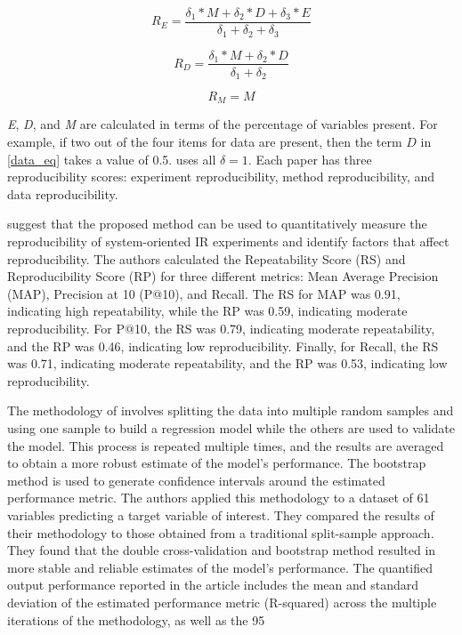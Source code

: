 \documentclass[12pt, a4paper, twocolumn]{article}
\begin{document}
			\begin{equation}
				R_{E} = \frac{\delta_1*M + \delta_2*D + \delta_3*E}{\delta_1 + \delta_2 + \delta_3}
			\end{equation}

			\begin{equation}\label{data_eq}
				R_{D} = \frac{\delta_1*M + \delta_2*D }{\delta_1 + \delta_2}
			\end{equation}

			\begin{equation}
				R_{M} = M 
			\end{equation}

			\textit{E}, \textit{D}, and \textit{M} are calculated in terms of the percentage of variables present. For example, if two out of the four items for data are present, then the term $D$ in \eqref{data_eq} takes a value of 0.5. \citet{gundersen2018state} uses all $\delta = 1$. Each paper has three reproducibility scores: experiment reproducibility, method reproducibility, and data reproducibility. 

			\citet{Breuer2020} suggest that the proposed method can be used to quantitatively measure the reproducibility of system-oriented IR experiments and identify factors that affect reproducibility. The authors calculated the Repeatability Score (RS) and Reproducibility Score (RP) for three different metrics: Mean Average Precision (MAP), Precision at 10 (P@10), and Recall. The RS for MAP was 0.91, indicating high repeatability, while the RP was 0.59, indicating moderate reproducibility. For P@10, the RS was 0.79, indicating moderate repeatability, and the RP was 0.46, indicating low reproducibility. Finally, for Recall, the RS was 0.71, indicating moderate repeatability, and the RP was 0.53, indicating low reproducibility.

			The methodology of \citet{Ang1998} involves splitting the data into multiple random samples and using one sample to build a regression model while the others are used to validate the model. This process is repeated multiple times, and the results are averaged to obtain a more robust estimate of the model's performance. The bootstrap method is used to generate confidence intervals around the estimated performance metric. The authors applied this methodology to a dataset of 61 variables predicting a target variable of interest. They compared the results of their methodology to those obtained from a traditional split-sample approach. They found that the double cross-validation and bootstrap method resulted in more stable and reliable estimates of the model's performance. The quantified output performance reported in the article includes the mean and standard deviation of the estimated performance metric (R-squared) across the multiple iterations of the methodology, as well as the 95%
\end{document}
